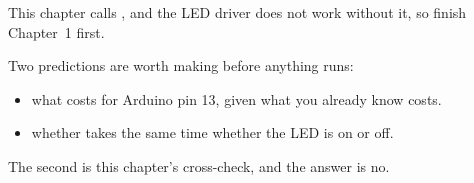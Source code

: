 This chapter calls , and the LED driver does not work without it, so finish
Chapter~1 first.

Two predictions are worth making before anything runs:
\begin{itemize}
  \item what  costs for Arduino pin 13, given what you already know 
    costs.
  \item whether  takes the same time whether the LED is on or off.
\end{itemize}
The second is this chapter's cross-check, and the answer is no.







